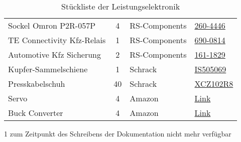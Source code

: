 \begin{table}[h]
\begin{threeparttable}
\begin{tabular}{|l|c|M{3cm}|l|}
    Sockel Omron P2R-057P & 4 & RS-Components & \href{https://at.rs-online.com/web/p/einbaumessgerate-zubehor/2604446/}{260-4446}\\
    TE Connectivity Kfz-Relais & 1 & RS-Components & \href{https://at.rs-online.com/web/p/monostabile-relais/6900814}{690-0814} \\
    Automotive Kfz Sicherung & 2 & RS-Components & \href{https://at.rs-online.com/web/p/kfz-sicherungen/1611829/}{161-1829}\\\hline
    Kupfer-Sammelschiene & 1 & Schrack & \href{https://www.schrack.at/shop/verteilereinbau-ls-fi-ueberspannungsableiter-d0-und-nh/schmelzsicherungs-und-sammelschienensysteme/sammelschienensysteme/sammelschienen/kupfersammelschiene/kupfer-sammelschiene-blank-379-a-450-a-30x5mm-2m-is505069.html}{IS505069}\\
    Presskabelschuh & 40 & Schrack & \href{https://www.schrack.at/shop/kabel-leitungen/presskabelschuh-kabelzubehoer/din-presskabelschuhe/presskabelschuh-10mm2-m8-xcz102r8.html}{XCZ102R8}\\\hline
    Servo & 4 & Amazon & \href{https://www.amazon.de/-/en/gp/product/B07T6DNLV4/}{Link}\\
    Buck Converter & 4 & Amazon & \href{https://www.amazon.de/gp/product/B085DSMFQM/ref=ppx_yo_dt_b_asin_image_o03_s00?ie=UTF8&psc=1}{Link} \\\hline 
    \end{tabular}
    \begin{tablenotes}\footnotesize 
        \item[1] zum Zeitpunkt des Schreibens der Dokumentation nicht mehr verfügbar 
    \end{tablenotes}
\end{threeparttable}
    \caption{Stückliste der Leistungselektronik}
\end{table}

\newpage
